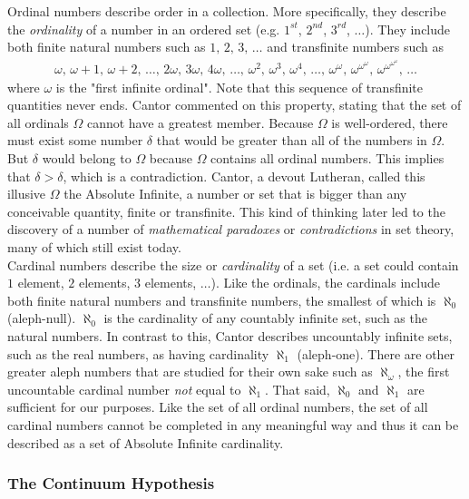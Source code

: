 Ordinal numbers describe order in a collection. More specifically, they describe the \textit{ordinality} of a number in an ordered set (e.g. $1^\textit{st}$, $2^\textit{nd}$, $3^\textit{rd}$, $\dots$). They include both finite natural numbers such as $1,\,2,\,3,\,\dots$ and transfinite numbers such as
\begin{align*}
\omega,\,\omega+1,\,\omega+2,\,\dots,\,2\omega,\,3\omega,\,4\omega,\,\dots,\,\omega^2,\,\omega^3,\,\omega^4,\,\dots,\,\omega^\omega,\,\omega^{\omega^\omega},\,\omega^{\omega^{\omega^\omega}},\,\dots
\end{align*}
where $\omega$ is the "first infinite ordinal". Note that this sequence of transfinite quantities never ends. Cantor commented on this property, stating that the set of all ordinals $\Omega$ cannot have a greatest member. Because $\Omega$ is well-ordered, there must exist some number $\delta$ that would be greater than all of the numbers in $\Omega$. But $\delta$ would belong to $\Omega$ because $\Omega$ contains all ordinal numbers. This implies that $\delta>\delta$, which is a contradiction. Cantor, a devout Lutheran, called this illusive $\Omega$ the Absolute Infinite, a number or set that is bigger than any conceivable quantity, finite or transfinite. This kind of thinking later led to the discovery of a number of \textit{mathematical paradoxes} or \textit{contradictions} in set theory, many of which still exist today. \\

Cardinal numbers describe the size or \textit{cardinality} of a set (i.e. a set could contain $1$ element, $2$ elements, $3$ elements, $\dots$). Like the ordinals, the cardinals include both finite natural numbers and transfinite numbers, the smallest of which is $\aleph_0$ (aleph-null). $\aleph_0$ is the cardinality of any countably infinite set, such as the natural numbers. In contrast to this, Cantor describes uncountably infinite sets, such as the real numbers, as having cardinality $\aleph_1$ (aleph-one). There are other greater aleph numbers that are studied for their own sake such as $\aleph_\omega$, the first uncountable cardinal number \textit{not} equal to $\aleph_1$. That said, $\aleph_0$ and $\aleph_1$ are sufficient for our purposes. Like the set of all ordinal numbers, the set of all cardinal numbers cannot be completed in any meaningful way and thus it can be described as a set of Absolute Infinite cardinality. \\

\subsubsection{The Continuum Hypothesis}

